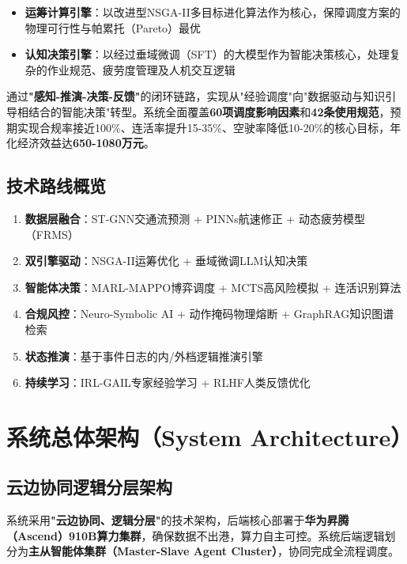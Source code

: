 \documentclass[12pt,a4paper]{article}
\begin{document}
\begin{itemize}[leftmargin=*]
    \item \textbf{运筹计算引擎}：以改进型NSGA-II多目标进化算法作为核心，保障调度方案的物理可行性与帕累托（Pareto）最优
    \item \textbf{认知决策引擎}：以经过垂域微调（SFT）的大模型作为智能决策核心，处理复杂的作业规范、疲劳度管理及人机交互逻辑
\end{itemize}

通过\textbf{"感知-推演-决策-反馈"}的闭环链路，实现从"经验调度"向"数据驱动与知识引导相结合的智能决策"转型。系统全面覆盖\textbf{60项调度影响因素}和\textbf{42条使用规范}，预期实现合规率接近100\%、连活率提升15-35\%、空驶率降低10-20\%的核心目标，年化经济效益达\textbf{650-1080万元}。

\subsection{技术路线概览}

\begin{enumerate}[leftmargin=*]
    \item \textbf{数据层融合}：ST-GNN交通流预测 + PINNs航速修正 + 动态疲劳模型（FRMS）
    \item \textbf{双引擎驱动}：NSGA-II运筹优化 + 垂域微调LLM认知决策
    \item \textbf{智能体决策}：MARL-MAPPO博弈调度 + MCTS高风险模拟 + 连活识别算法
    \item \textbf{合规风控}：Neuro-Symbolic AI + 动作掩码物理熔断 + GraphRAG知识图谱检索
    \item \textbf{状态推演}：基于事件日志的内/外档逻辑推演引擎
    \item \textbf{持续学习}：IRL-GAIL专家经验学习 + RLHF人类反馈优化
\end{enumerate}

\section{系统总体架构（System Architecture）}

\subsection{云边协同逻辑分层架构}

系统采用\textbf{"云边协同、逻辑分层"}的技术架构，后端核心部署于\textbf{华为昇腾（Ascend）910B算力集群}，确保数据不出港，算力自主可控。系统后端逻辑划分为\textbf{主从智能体集群（Master-Slave Agent Cluster）}，协同完成全流程调度。
\end{document}

